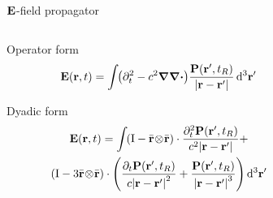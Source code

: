 \documentclass[aspectratio=169, usenames, dvipsnames]{beamer}
\newcommand{\outerprod}[2]{#1 \! \otimes \! #2}
\newcommand{\integralspace}{\kern0.1em}
\newcommand{\sint}{\int_{} \integralspace}
\begin{document}
\begin{frame}{$\vb{E}$-field propagator}
  \begin{columns}
    \begin{column}{0.5\textwidth}
      \begin{block}{Operator form}
        \begin{equation*}
          \vb{E}(\vb{r}, t) = \sint \qty(\partial_t^2 - c^2 \grad \grad \boldsymbol{\cdot})\frac{\vb{P}(\vb{r}', t_R)}{\abs{\vb{r} - \vb{r}'}} \dd[3]{\vb{r}'}
        \end{equation*}
      \end{block}
      \begin{block}{Dyadic form}
        \begin{equation*}
          \begin{gathered}
            \vb{E}(\vb{r}, t) = \sint
              \left(\mathrm{I} -  \outerprod{\bar{\vb{r}}}{\bar{\vb{r}}} \right) \cdot \frac{\partial_t^2 \vb{P}(\vb{r}', t_R)}{c^2 \abs{\vb{r}-\vb{r}'}} + \\
              \left(\mathrm{I} - 3\outerprod{\bar{\vb{r}}}{\bar{\vb{r}}} \right) \cdot \qty(
                \frac{\partial_t   \vb{P}(\vb{r}', t_R)}{c \abs{\vb{r}-\vb{r}'}^2} +
                \frac{             \vb{P}(\vb{r}', t_R)}{  \abs{\vb{r}-\vb{r}'}^3}
              ) \dd[3]{\vb{r}'}
          \end{gathered}
        \end{equation*}
      \end{block}
    \end{column}
    \begin{column}{0.5\textwidth}
      \begin{center}
        
        
      \end{center}
    \end{column}
  \end{columns}
\end{frame}
\end{document}

